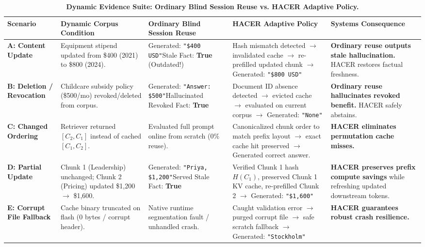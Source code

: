 \begin{table}[t]
\centering
\caption{\textbf{Dynamic Evidence Suite: Ordinary Blind Session Reuse vs. HACER Adaptive Policy.}}
\label{tab:staleness_suite}
\small
\begin{tabular}{p{2.2cm}p{3.2cm}p{3.8cm}p{4.2cm}p{3.2cm}}
\toprule
\textbf{Scenario} & \textbf{Dynamic Corpus Condition} & \textbf{Ordinary Blind Session Reuse} & \textbf{HACER Adaptive Policy} & \textbf{Systems Consequence} \\
\midrule
\textbf{A: Content Update} & Equipment stipend updated from \$400 (2021) to \$800 (2024). & Generated: \texttt{"\$400 USD"}\newline Stale Fact: \textbf{True} (Outdated!) & Hash mismatch detected $\rightarrow$ invalidated cache $\rightarrow$ re-prefilled updated chunk $\rightarrow$ Generated: \texttt{"\$800 USD"} & \textbf{Ordinary reuse outputs stale hallucination.} HACER restores factual freshness. \\
\addlinespace
\textbf{B: Deletion / Revocation} & Childcare subsidy policy (\$500/mo) revoked/deleted from corpus. & Generated: \texttt{"Answer: \$500"}\newline Hallucinated Revoked Fact: \textbf{True} & Document ID absence detected $\rightarrow$ evicted cache $\rightarrow$ evaluated on current corpus $\rightarrow$ Generated: \texttt{"None"} & \textbf{Ordinary reuse hallucinates revoked benefit.} HACER safely abstains. \\
\addlinespace
\textbf{C: Changed Ordering} & Retriever returned $[C_2, C_1]$ instead of cached $[C_1, C_2]$. & Evaluated full prompt online from scratch ($0\%$ reuse). & Canonicalized chunk order to match prefix layout $\rightarrow$ exact cache hit preserved $\rightarrow$ Generated correct answer. & \textbf{HACER eliminates permutation cache misses.} \\
\addlinespace
\textbf{D: Partial Update} & Chunk 1 (Leadership) unchanged; Chunk 2 (Pricing) updated \$1,200 $\rightarrow$ \$1,600. & Generated: \texttt{"Priya, \$1,200"}\newline Served Stale Fact: \textbf{True} & Verified Chunk 1 hash $H(C_1)$, preserved Chunk 1 KV cache, re-prefilled Chunk 2 $\rightarrow$ Generated: \texttt{"\$1,600"} & \textbf{HACER preserves prefix compute savings} while refreshing updated downstream tokens. \\
\addlinespace
\textbf{E: Corrupt File Fallback} & Cache binary truncated on flash ($0$ bytes / corrupt header). & Native runtime segmentation fault / unhandled crash. & Caught validation error $\rightarrow$ purged corrupt file $\rightarrow$ safe scratch fallback $\rightarrow$ Generated: \texttt{"Stockholm"} & \textbf{HACER guarantees robust crash resilience.} \\
\bottomrule
\end{tabular}
\end{table}

